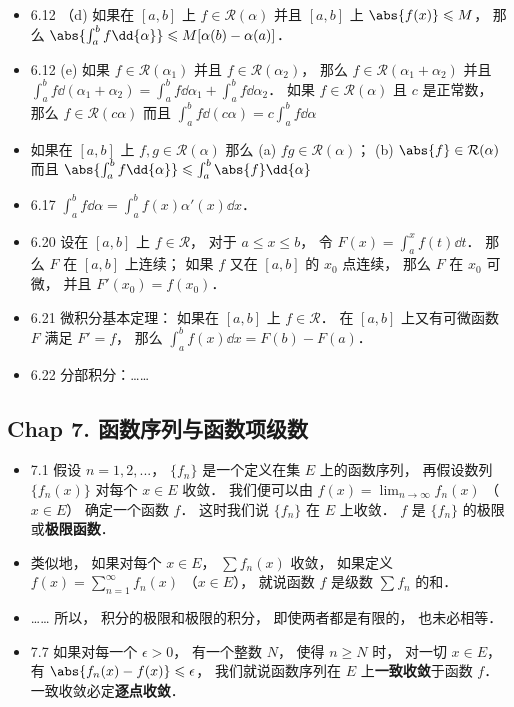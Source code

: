 \begin{itemize}
\item 6.12 （d) 如果在 $[a,b]$ 上 $f\in \mathcal{R}(\alpha)$ 并且 $[a,b]$ 上 $\abs{f(x)}\leqslant M$， 那么 $\abs{\int_a^bf\dd{\alpha}} \leqslant M[\alpha(b)-\alpha(a)]$．

\item 6.12 (e) 如果 $f\in \mathcal{R}(\alpha_1)$ 并且 $f\in \mathcal{R}(\alpha_2)$， 那么 $f\in \mathcal{R}(\alpha_1+\alpha_2)$ 并且 $\int_a^bf\dd{(\alpha_1+\alpha_2)} = \int_a^bf\dd{\alpha_1}+ \int_a^bf\dd{\alpha_2}$． 如果 $f\in \mathcal{R}(\alpha)$ 且 $c$ 是正常数， 那么 $f\in \mathcal{R}(c\alpha)$ 而且 $\int_a^bf\dd{(c\alpha)} = c\int_a^bf\dd{\alpha}$

\item 如果在 $[a,b]$ 上 $f,g\in \mathcal{R}(\alpha)$ 那么 (a) $fg\in \mathcal{R}(\alpha)$； (b) $\abs{f}\in \mathcal{R}(\alpha)$ 而且 $\abs{\int_a^bf\dd{\alpha}} \leqslant \int_a^b\abs{f}\dd{\alpha}$

\item 6.17 $\int_a^b f\dd{\alpha} = \int_a^b f(x)\alpha'(x)\dd{x}$．

\item 6.20 设在 $[a,b]$ 上 $f\in \mathcal{R}$， 对于 $a\leqslant x\leqslant b$， 令 $F(x) = \int_a^x f(t)\dd{t}$． 那么 $F$ 在 $[a,b]$ 上连续； 如果 $f$ 又在 $[a,b]$ 的 $x_0$ 点连续， 那么 $F$ 在 $x_0$ 可微， 并且 $F'(x_0) = f(x_0)$．

\item 6.21 微积分基本定理： 如果在 $[a,b]$ 上 $f\in \mathcal{R}$． 在 $[a,b]$ 上又有可微函数 $F$ 满足 $F' = f$， 那么 $\int_a^b f(x)\dd{x} = F(b)-F(a)$．

\item 6.22 分部积分：……
\end{itemize}

\subsection{Chap 7. 函数序列与函数项级数}

\begin{itemize}
\item 7.1 假设 $n=1,2,...$， $\{f_n\}$ 是一个定义在集 $E$ 上的函数序列， 再假设数列 $\{f_n(x)\}$ 对每个 $x\in E$ 收敛． 我们便可以由 $f(x) = \lim_{n\to\infty} f_n(x)$ （$x\in E$） 确定一个函数 $f$． 这时我们说 $\{f_n\}$ 在 $E$ 上收敛． $f$ 是 $\{f_n\}$ 的极限或\textbf{极限函数}．

\item 类似地， 如果对每个 $x\in E$， $\sum f_n(x)$ 收敛， 如果定义 $f(x) = \sum_{n=1}^\infty f_n(x)$ （$x\in E$）， 就说函数 $f$ 是级数 $\sum f_n$ 的和．

\item …… 所以， 积分的极限和极限的积分， 即使两者都是有限的， 也未必相等．

\item 7.7 如果对每一个 $\epsilon >0$， 有一个整数 $N$， 使得 $n\geqslant N$ 时， 对一切 $x\in E$， 有 $\abs{f_n(x)-f(x)} \leqslant \epsilon$， 我们就说函数序列在 $E$ 上\textbf{一致收敛}于函数 $f$． 一致收敛必定\textbf{逐点收敛}．

\end{itemize}


